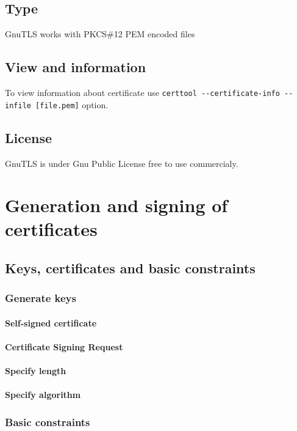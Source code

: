 \documentclass[10pt, a4paper]{report}
\begin{document}
  \subsection{Type}
GnuTLS works with PKCS\#12 PEM encoded files
  \subsection{View and information}
To view information about certificate use \verb+certtool --certificate-info --infile [file.pem]+ option.
  \subsection{License}
GnuTLS is under Gnu Public License \- free to use commercialy.
  
\section{Generation and signing of certificates}

  \subsection{Keys, certificates and basic constraints}
  
    \subsubsection{Generate keys}
    
      \paragraph{Self-signed certificate}

      \paragraph{Certificate Signing Request}
      
      \paragraph{Specify length}
      
      \paragraph{Specify algorithm}
      
    \subsubsection{Basic constraints}
    
\end{document}
